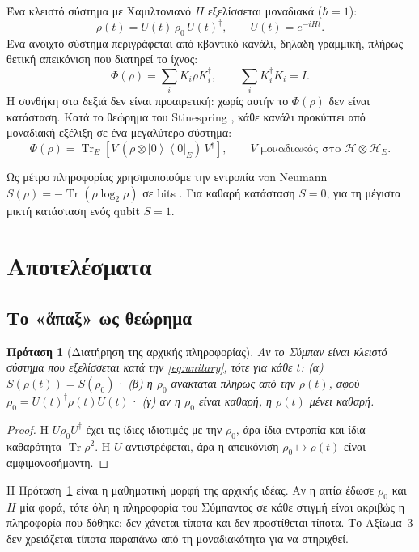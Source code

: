 \documentclass[a4paper,11pt]{article}
\newtheorem{prop}{Πρόταση}
\theoremstyle{definition}
\newcommand{\ket}[1]{\left|#1\right\rangle}
\newcommand{\bra}[1]{\left\langle#1\right|}
\newcommand{\Tr}{\operatorname{Tr}}
\begin{document}
Ένα κλειστό σύστημα με Χαμιλτονιανό $H$ εξελίσσεται μοναδιακά ($\hbar=1$):
\begin{equation}\label{eq:unitary}
\rho(t)=U(t)\,\rho_0\,U(t)^\dagger,\qquad U(t)=e^{-iHt}.
\end{equation}
Ένα ανοιχτό σύστημα περιγράφεται από κβαντικό κανάλι, δηλαδή γραμμική, πλήρως θετική απεικόνιση που διατηρεί το ίχνος:
\begin{equation}\label{eq:channel}
\Phi(\rho)=\sum_i K_i\rho K_i^\dagger,\qquad \sum_i K_i^\dagger K_i=I.
\end{equation}
Η συνθήκη στα δεξιά δεν είναι προαιρετική: χωρίς αυτήν το $\Phi(\rho)$ δεν είναι κατάσταση. Κατά το θεώρημα του Stinespring \cite{stinespring}, κάθε κανάλι προκύπτει από μοναδιακή εξέλιξη σε ένα μεγαλύτερο σύστημα:
\begin{equation}\label{eq:stinespring}
\Phi(\rho)=\Tr_E\!\left[V\,(\rho\otimes\ket{0}\bra{0}_E)\,V^\dagger\right],\qquad V \text{ μοναδιακός στο } \mathcal H\otimes\mathcal H_E .
\end{equation}

Ως μέτρο πληροφορίας χρησιμοποιούμε την εντροπία von Neumann $S(\rho)=-\Tr(\rho\log_2\rho)$ σε bits \cite{vonneumann}. Για καθαρή κατάσταση $S=0$, για τη μέγιστα μικτή κατάσταση ενός qubit $S=1$.

\section{Αποτελέσματα}

\subsection{Το «ἅπαξ» ως θεώρημα}

\begin{prop}[Διατήρηση της αρχικής πληροφορίας]\label{prop:apax}
Αν το Σύμπαν είναι κλειστό σύστημα που εξελίσσεται κατά την \eqref{eq:unitary}, τότε για κάθε $t$:
(α) $S(\rho(t))=S(\rho_0)$· (β) η $\rho_0$ ανακτάται πλήρως από την $\rho(t)$, αφού $\rho_0=U(t)^\dagger\rho(t)U(t)$· (γ) αν η $\rho_0$ είναι καθαρή, η $\rho(t)$ μένει καθαρή.
\end{prop}
\begin{proof}
Η $U\rho_0U^\dagger$ έχει τις ίδιες ιδιοτιμές με την $\rho_0$, άρα ίδια εντροπία και ίδια καθαρότητα $\Tr\rho^2$. Η $U$ αντιστρέφεται, άρα η απεικόνιση $\rho_0\mapsto\rho(t)$ είναι αμφιμονοσήμαντη.
\end{proof}

Η Πρόταση~\ref{prop:apax} είναι η μαθηματική μορφή της αρχικής ιδέας. Αν η αιτία έδωσε $\rho_0$ και $H$ μία φορά, τότε όλη η πληροφορία του Σύμπαντος σε κάθε στιγμή είναι ακριβώς η πληροφορία που δόθηκε: δεν χάνεται τίποτα και δεν προστίθεται τίποτα. Το Αξίωμα~3 δεν χρειάζεται τίποτα παραπάνω από τη μοναδιακότητα για να στηριχθεί.
\end{document}
